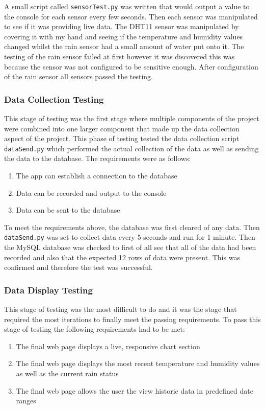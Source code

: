 \documentclass[10pt,a4paper]{article}
\begin{document}
A small script called \texttt{sensorTest.py} was written that would output a value to the console for each sensor every few seconds. Then each sensor was manipulated to see if it was providing live data. The DHT11 sensor was manipulated by covering it with my hand and seeing if the temperature and humidity values changed whilst the rain sensor had a small amount of water put onto it. The testing of the rain sensor failed at first however it was discovered this was because the sensor was not configured to be sensitive enough. After configuration of the rain sensor all sensors passed the testing. 

\subsubsection{Data Collection Testing}
This stage of testing was the first stage where multiple components of the project were combined into one larger component that made up the data collection aspect of the project. This phase of testing tested the data collection script \texttt{dataSend.py} which performed the actual collection of the data as well as sending the data to the database. The requirements were as follows: 

\begin{enumerate}
  \item The app can establish a connection to the database
  \item Data can be recorded and output to the console
  \item Data can be sent to the database
\end{enumerate}

To meet the requirements above, the database was first cleared of any data. Then \texttt{dataSend.py} was set to collect data every 5 seconds and run for 1 minute. Then the MySQL database was checked to first of all see that all of the data had been recorded and also that the expected 12 rows of data were present. This was confirmed and therefore the test was successful.

\subsubsection{Data Display Testing}
This stage of testing was the most difficult to do and it was the stage that required the most iterations to finally meet the passing requirements. To pass this stage of testing the following requirements had to be met:

\begin{enumerate}
  \item The final web page displays a live, responsive chart section
  \item The final web page displays the most recent temperature and humidity values as well as the current rain status
  \item The final web page allows the user the view historic data in predefined date ranges
\end{enumerate}
\end{document}
